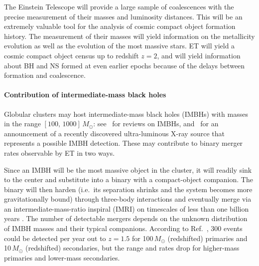 
The Einstein Telescope will provide a large sample of coalescences with 
the precise measurement of their masses and luminosity distances.  This will be an 
extremely valuable tool for the analysis of cosmic compact object formation 
history.  The measurement of their masses will yield information on the 
metallicity evolution as well as the evolution of the most massive stars. ET will 
yield a cosmic compact object census up to redshift $z=2$, and will yield 
information about BH and NS formed at even earlier epochs because of 
the delays between formation and coalescence.

\paragraph{Contribution of intermediate-mass black holes}

Globular clusters may host intermediate-mass black holes (IMBHs) with masses 
in the range $[100,\,1000]\,M_\odot$: see~\cite{MillerColbert:2004, Miller:2009} 
for reviews on IMBHs, and~\cite{2009Natur.460...73F} for an announcement of a 
recently discovered ultra-luminous X-ray source that represents a possible IMBH 
detection.  These may contribute to binary merger rates observable by ET in two ways.

Since an IMBH will be the most massive object in the cluster, it will readily 
sink to the center and substitute into a binary with a compact-object companion.  
The binary will then harden (i.e.\ its separation shrinks and the system becomes
more gravitationally bound) through three-body interactions and eventually merge 
via an intermediate-mass-ratio inspiral (IMRI) on timescales of less than one 
billion years \cite{imrirate}.  The number of detectable mergers depends on the 
unknown distribution of IMBH masses and their typical companions.  According to 
Ref.~\cite{Gair:2009ETrev}, 300 events could be detected per year out to $z=1.5$ for 
100\,$M_\odot$ (redshifted) primaries and 10\,$M_\odot$ (redshifted) 
secondaries, but the range and rates drop for higher-mass primaries and 
lower-mass secondaries.

